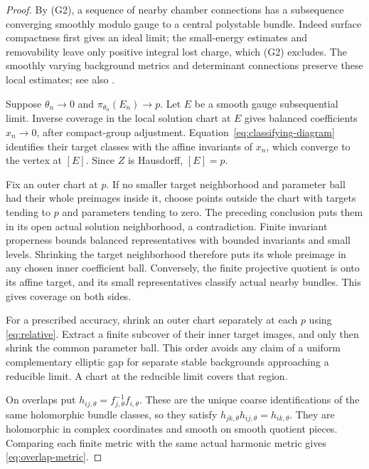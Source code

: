 \begin{proof}
By (G2), a sequence of nearby chamber connections has a subsequence
converging smoothly modulo gauge to a central polystable bundle.
Indeed surface compactness first gives an ideal limit; the
small-energy estimates and removability leave only positive
integral lost charge, which (G2) excludes. The smoothly varying
background metrics and determinant connections preserve these
local estimates; see also \cite[Lemma~3.2]{wuebben17}.

Suppose \(\theta_n\to0\) and \(\pi_{\theta_n}(E_n)\to p\).
Let \(E\) be a smooth gauge subsequential limit.
Inverse coverage in the local solution chart at \(E\) gives
balanced coefficients \(x_n\to0\), after compact-group adjustment.
Equation~\eqref{eq:classifying-diagram} identifies their target
classes with the affine invariants of \(x_n\), which converge
to the vertex at \([E]\). Since \(Z\) is Hausdorff, \([E]=p\).

Fix an outer chart at \(p\). If no smaller target neighborhood
and parameter ball had their whole preimages inside it, choose
points outside the chart with targets tending to \(p\) and
parameters tending to zero. The preceding conclusion puts them
in its open actual solution neighborhood, a contradiction.
Finite invariant properness bounds balanced representatives with
bounded invariants and small levels. Shrinking the target neighborhood
therefore puts its whole preimage in any chosen inner coefficient
ball. Conversely, the finite projective quotient is onto its affine
target, and its small representatives classify actual nearby
bundles. This gives coverage on both sides.

For a prescribed accuracy, shrink an outer chart separately at
each \(p\) using \eqref{eq:relative}. Extract a finite subcover of
their inner target images, and only then shrink the common parameter
ball. This order avoids any claim of a uniform complementary
elliptic gap for separate stable backgrounds approaching a
reducible limit. A chart at the reducible limit covers that region.

On overlaps put \(h_{ij,\theta}=f_{j,\theta}^{-1}f_{i,\theta}\).
These are the unique coarse identifications of the same holomorphic
bundle classes, so they satisfy \(h_{jk,\theta}h_{ij,\theta}
=h_{ik,\theta}\). They are holomorphic in complex coordinates and
smooth on smooth quotient pieces. Comparing each finite metric
with the same actual harmonic metric gives
\eqref{eq:overlap-metric}.
\end{proof}

